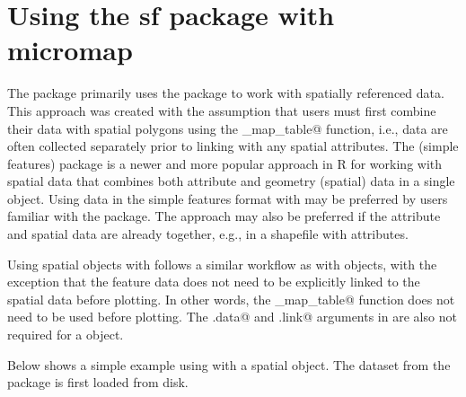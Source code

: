\documentclass{article}
\begin{document}
\section{Using the sf package with micromap}

The \verb@micromap@ package primarily uses the \verb@sp@ package to work with spatially referenced data. This approach was created with the assumption that \verb@micromap@ users must first combine their data with spatial polygons using the \verb@create_map_table@ function, i.e., data are often collected separately prior to linking with any spatial attributes. The \verb@sf@ (simple features) package is a newer and more popular approach in R for working with spatial data that combines both attribute and geometry (spatial) data in a single object. Using data in the simple features format with \verb@micromap@ may be preferred by users familiar with the package.  The approach may also be preferred if the attribute and spatial data are already together, e.g., in a shapefile with attributes.

Using \verb@sf@ spatial objects with \verb@micromap@ follows a similar workflow as with \verb@sp@ objects, with the exception that the feature data does not need to be explicitly linked to the spatial data before plotting.  In other words, the \verb@create_map_table@ function does not need to be used before plotting.  The \verb@stat.data@ and \verb@map.link@ arguments in \verb@mmplot@ are also not required for a \verb@sf@ object.  

Below shows a simple example using \verb@micromap@ with a \verb@sf@ spatial object. The \verb@nc@ dataset from the \verb@sf@ package is first loaded from disk. 
\end{document}
